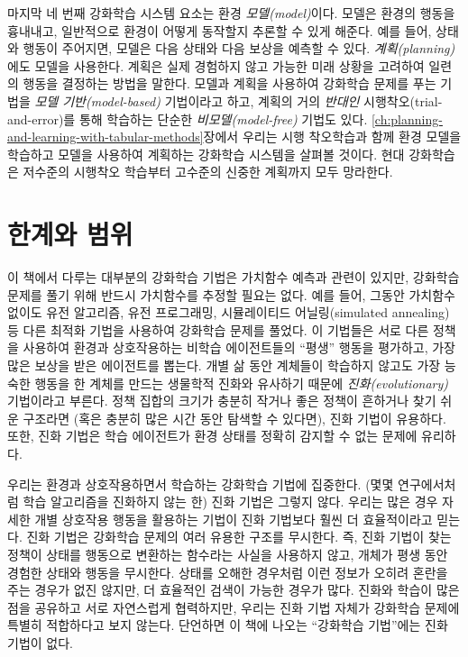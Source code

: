 마지막 네 번째 강화학습 시스템 요소는 환경 \emph{모델(model)}이다. 모델은 환경의
행동을 흉내내고, 일반적으로 환경이 어떻게 동작할지 추론할 수 있게 해준다. 예를
들어, 상태와 행동이 주어지면, 모델은 다음 상태와 다음 보상을 예측할 수 있다.
\emph{계획(planning)}에도 모델을 사용한다. 계획은 실제 경험하지 않고 가능한 미래
상황을 고려하여 일련의 행동을 결정하는 방법을 말한다. 모델과 계획을 사용하여
강화학습 문제를 푸는 기법을 \emph{모델 기반(model-based)} 기법이라고 하고,
계획의 거의 \emph{반대인} 시행착오(trial-and-error)를 통해 학습하는 단순한
\emph{비모델(model-free)} 기법도 있다.
\ref{ch:planning-and-learning-with-tabular-methods}장에서 우리는 시행 착오학습과
함께 환경 모델을 학습하고 모델을 사용하여 계획하는 강화학습 시스템을 살펴볼
것이다. 현대 강화학습은 저수준의 시행착오 학습부터 고수준의 신중한 계획까지 모두
망라한다.

\section{한계와 범위}

이 책에서 다루는 대부분의 강화학습 기법은 가치함수 예측과 관련이 있지만,
강화학습 문제를 풀기 위해 반드시 가치함수를 추정할 필요는 없다. 예를 들어,
그동안 가치함수 없이도 유전 알고리즘, 유전 프로그래밍, 시뮬레이티드
어닐링(simulated annealing) 등 다른 최적화 기법을 사용하여 강화학습 문제를
풀었다. 이 기법들은 서로 다른 정책을 사용하여 환경과 상호작용하는 비학습
에이전트들의 ``평생'' 행동을 평가하고, 가장 많은 보상을 받은 에이전트를 뽑는다.
개별 삶 동안 계체들이 학습하지 않고도 가장 능숙한 행동을 한 계체를 만드는
생물학적 진화와 유사하기 때문에 \emph{진화(evolutionary)} 기법이라고 부른다.
정책 집합의 크기가 충분히 작거나 좋은 정책이 흔하거나 찾기 쉬운 구조라면 (혹은
충분히 많은 시간 동안 탐색할 수 있다면), 진화 기법이 유용하다. 또한, 진화 기법은
학습 에이전트가 환경 상태를 정확히 감지할 수 없는 문제에 유리하다.


우리는 환경과 상호작용하면서 학습하는 강화학습 기법에 집중한다. (몇몇
연구에서처럼 학습 알고리즘을 진화하지 않는 한) 진화 기법은 그렇지 않다. 우리는
많은 경우 자세한 개별 상호작용 행동을 활용하는 기법이 진화 기법보다 훨씬 더
효율적이라고 믿는다. 진화 기법은 강화학습 문제의 여러 유용한 구조를 무시한다.
즉, 진화 기법이 찾는 정책이 상태를 행동으로 변환하는 함수라는 사실을 사용하지
않고, 개체가 평생 동안 경험한 상태와 행동을 무시한다. 상태를 오해한 경우처럼
이런 정보가 오히려 혼란을 주는 경우가 없진 않지만, 더 효율적인 검색이 가능한
경우가 많다. 진화와 학습이 많은 점을 공유하고 서로 자연스럽게 협력하지만, 우리는
진화 기법 자체가 강화학습 문제에 특별히 적합하다고 보지 않는다. 단언하면 이 책에
나오는 ``강화학습 기법''에는 진화 기법이 없다.

